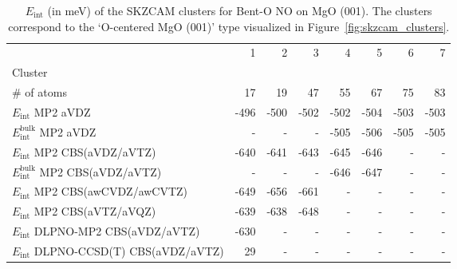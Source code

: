 \begin{table}
\caption{\label{tab:system_eint_mgo_no_bent-o}$E_\textrm{int}$ (in meV) of the SKZCAM clusters for Bent-O NO on MgO (001). The clusters correspond to the `O-centered MgO (001)' type visualized in Figure~\ref{fig:skzcam_clusters}.}
\begin{adjustbox}{center,max width=1.4\textwidth}
\begin{tabular}{lrrrrrrr}
\toprule
 & 1 & 2 & 3 & 4 & 5 & 6 & 7 \\ 
Cluster &  &  &  &  &  &  &  \\
\midrule
\# of atoms & 17 & 19 & 47 & 55 & 67 & 75 & 83 \\
$E_\textrm{int}$ MP2 aVDZ & -496 & -500 & -502 & -502 & -504 & -503 & -503 \\
$E_\textrm{int}^\textrm{bulk}$ MP2 aVDZ & - & - & - & -505 & -506 & -505 & -505 \\
$E_\textrm{int}$ MP2 CBS(aVDZ/aVTZ) & -640 & -641 & -643 & -645 & -646 & - & - \\
$E_\textrm{int}^\textrm{bulk}$ MP2 CBS(aVDZ/aVTZ) & - & - & - & -646 & -647 & - & - \\
$E_\textrm{int}$ MP2 CBS(awCVDZ/awCVTZ) & -649 & -656 & -661 & - & - & - & - \\
$E_\textrm{int}$ MP2 CBS(aVTZ/aVQZ) & -639 & -638 & -648 & - & - & - & - \\
$E_\textrm{int}$ DLPNO-MP2 CBS(aVDZ/aVTZ) & -630 & - & - & - & - & - & - \\
$E_\textrm{int}$ DLPNO-CCSD(T) CBS(aVDZ/aVTZ) & 29 & - & - & - & - & - & - \\
\bottomrule
\end{tabular}
\end{adjustbox}
\end{table}

